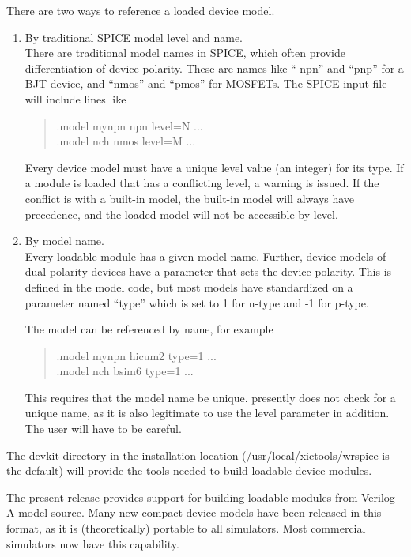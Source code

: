 There are two ways to reference a loaded device model.
\begin{enumerate}
\item{By traditional SPICE model level and name.\\
There are traditional model names in SPICE, which often provide
differentiation of device polarity.  These are names like ``{\vt
npn}'' and ``{\vt pnp}'' for a BJT device, and ``{\vt nmos}'' and
``{\vt pmos}'' for MOSFETs.  The SPICE input file will include lines
like
\begin{quote}
{\vt .model mynpn npn level=N ...}\\
{\vt .model nch nmos level=M ...}
\end{quote}
Every device model must have a unique {\vt level} value (an integer)
for its type.  If a module is loaded that has a conflicting level, a
warning is issued.  If the conflict is with a built-in model, the
built-in model will always have precedence, and the loaded model will
not be accessible by level.}

\item{By model name.\\
Every loadable module has a given model name.  Further, device models
of dual-polarity devices have a parameter that sets the device
polarity.  This is defined in the model code, but most models have
standardized on a parameter named ``{\vt type}'' which is set to 1 for
n-type and -1 for p-type.

The model can be referenced by name, for example
\begin{quote}
{\vt .model mynpn hicum2 type=1 ...}\\
{\vt .model nch bsim6 type=1 ...}
\end{quote}
This requires that the model name be unique.  {\WRspice} presently
does not check for a unique name, as it is also legitimate to use the
level parameter in addition.  The user will have to be careful.}
\end{enumerate}

The {\vt devkit} directory in the {\WRspice} installation location
({\vt /usr/local/xictools/wrspice} is the default) will provide
the tools needed to build loadable device modules.

The present release provides support for building loadable modules
from Verilog-A model source.  Many new compact device models have been
released in this format, as it is (theoretically) portable to all
simulators.  Most commercial simulators now have this capability.

